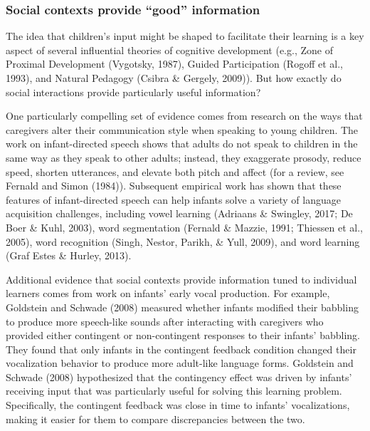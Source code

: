 \documentclass[english,floatsintext,man]{apa6}
\theoremstyle{definition}
\theoremstyle{definition}
\theoremstyle{definition}
\theoremstyle{remark}
\begin{document}
\subsubsection{\texorpdfstring{Social contexts provide \enquote{good}
information}{Social contexts provide good information}}\label{social-contexts-provide-good-information}

The idea that children's input might be shaped to facilitate their
learning is a key aspect of several influential theories of cognitive
development (e.g., Zone of Proximal Development (Vygotsky, 1987), Guided
Participation (Rogoff et al., 1993), and Natural Pedagogy (Csibra \&
Gergely, 2009)). But how exactly do social interactions provide
particularly useful information?

One particularly compelling set of evidence comes from research on the
ways that caregivers alter their communication style when speaking to
young children. The work on infant-directed speech shows that adults do
not speak to children in the same way as they speak to other adults;
instead, they exaggerate prosody, reduce speed, shorten utterances, and
elevate both pitch and affect (for a review, see Fernald and Simon
(1984)). Subsequent empirical work has shown that these features of
infant-directed speech can help infants solve a variety of language
acquisition challenges, including vowel learning (Adriaans \& Swingley,
2017; De Boer \& Kuhl, 2003), word segmentation (Fernald \& Mazzie,
1991; Thiessen et al., 2005), word recognition (Singh, Nestor, Parikh,
\& Yull, 2009), and word learning (Graf Estes \& Hurley, 2013).

Additional evidence that social contexts provide information tuned to
individual learners comes from work on infants' early vocal production.
For example, Goldstein and Schwade (2008) measured whether infants
modified their babbling to produce more speech-like sounds after
interacting with caregivers who provided either contingent or
non-contingent responses to their infants' babbling. They found that
only infants in the contingent feedback condition changed their
vocalization behavior to produce more adult-like language forms.
Goldstein and Schwade (2008) hypothesized that the contingency effect
was driven by infants' receiving input that was particularly useful for
solving this learning problem. Specifically, the contingent feedback was
close in time to infants' vocalizations, making it easier for them to
compare discrepancies between the two.
\end{document}
